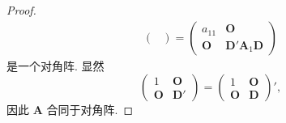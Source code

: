 \documentclass[../../main.tex]{subfiles}%
\begin{document}
\begin{proof}
\begin{align*}
\begin{pmatrix}
\end{pmatrix}
=
\begin{pmatrix}
a_{11} & \boldsymbol{O} \\
\boldsymbol{O} & \boldsymbol{D}'\boldsymbol{A}_1\boldsymbol{D}
\end{pmatrix}
\end{align*}
是一个对角阵. 显然
\[
\begin{pmatrix}
1 & \boldsymbol{O} \\
\boldsymbol{O} & \boldsymbol{D}'
\end{pmatrix}
=
\begin{pmatrix}
1 & \boldsymbol{O} \\
\boldsymbol{O} & \boldsymbol{D}
\end{pmatrix}',
\]
因此 $\boldsymbol{A}$ 合同于对角阵.

\end{proof}
\end{document}
